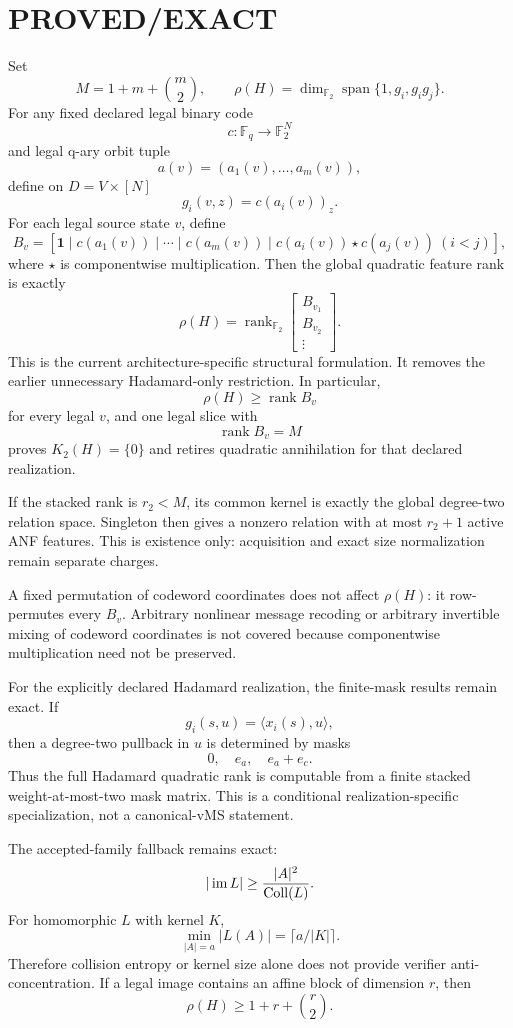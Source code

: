 \documentclass[11pt]{article}
\begin{document}
\section*{PROVED/EXACT}
Set
\[
M=1+m+\binom m2,\qquad
\rho(H)=\dim_{\mathbb F_2}\operatorname{span}\{1,g_i,g_i g_j\}.
\]
For any fixed declared legal binary code
\[
c:\mathbb F_q\to\mathbb F_2^N
\]
and legal q-ary orbit tuple
\[
a(v)=(a_1(v),\ldots,a_m(v)),
\]
define on \(D=V\times[N]\)
\[
g_i(v,z)=c(a_i(v))_z.
\]
For each legal source state \(v\), define
\[
B_v=
\left[
\mathbf1\mid c(a_1(v))\mid\cdots\mid c(a_m(v))
\mid c(a_i(v))\star c(a_j(v))\ (i<j)
\right],
\]
where \(\star\) is componentwise multiplication. Then the global quadratic feature rank is exactly
\[
\boxed{
\rho(H)=
\operatorname{rank}_{\mathbb F_2}
\begin{bmatrix}
B_{v_1}\\B_{v_2}\\\vdots
\end{bmatrix}.
}
\]
This is the current architecture-specific structural formulation. It removes the earlier unnecessary Hadamard-only restriction. In particular,
\[
\rho(H)\ge\operatorname{rank}B_v
\]
for every legal \(v\), and one legal slice with
\[
\operatorname{rank}B_v=M
\]
proves \(K_2(H)=\{0\}\) and retires quadratic annihilation for that declared realization.

If the stacked rank is \(r_2<M\), its common kernel is exactly the global degree-two relation space. Singleton then gives a nonzero relation with at most \(r_2+1\) active ANF features. This is existence only: acquisition and exact size normalization remain separate charges.

A fixed permutation of codeword coordinates does not affect \(\rho(H)\): it row-permutes every \(B_v\). Arbitrary nonlinear message recoding or arbitrary invertible mixing of codeword coordinates is not covered because componentwise multiplication need not be preserved.

For the explicitly declared Hadamard realization, the finite-mask results remain exact. If
\[
g_i(s,u)=\langle x_i(s),u\rangle,
\]
then a degree-two pullback in \(u\) is determined by masks
\[
0,\quad e_a,\quad e_a+e_c.
\]
Thus the full Hadamard quadratic rank is computable from a finite stacked weight-at-most-two mask matrix. This is a conditional realization-specific specialization, not a canonical-vMS statement.

The accepted-family fallback remains exact:
\[
|\operatorname{im}L|\ge {|A|^2\over \operatorname{Coll}(L)}.
\]
For homomorphic \(L\) with kernel \(K\),
\[
\min_{|A|=a}|L(A)|=\lceil a/|K|\rceil.
\]
Therefore collision entropy or kernel size alone does not provide verifier anti-concentration. If a legal image contains an affine block of dimension \(r\), then
\[
\rho(H)\ge1+r+\binom r2.
\]
\end{document}
